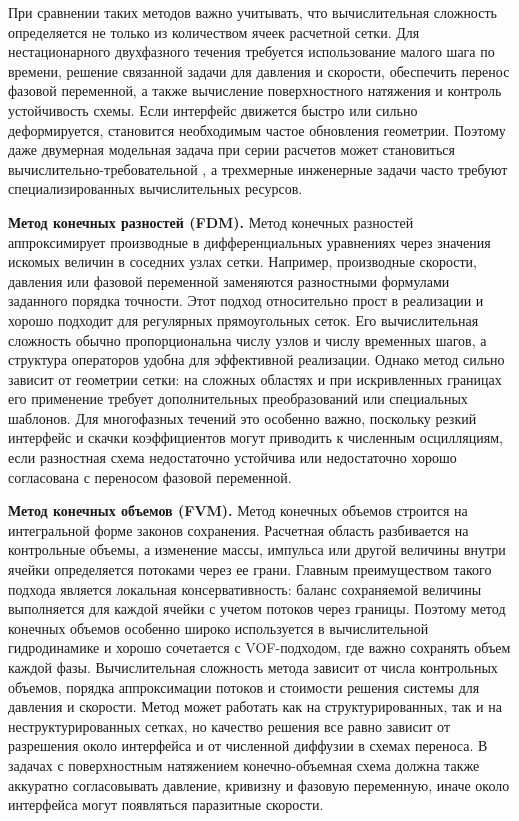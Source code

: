 \documentclass[12pt,a4paper]{article}
\begin{document}
При сравнении таких методов важно учитывать, что вычислительная сложность
определяется не только из количеством ячеек расчетной сетки. Для нестационарного двухфазного течения
требуется использование малого шага по времени, решение связанной задачи для давления и
скорости, обеспечить перенос фазовой переменной, а также вычисление поверхностного натяжения и
контроль устойчивость схемы. Если интерфейс движется быстро или сильно
деформируется, становится необходимым частое обновления геометрии. Поэтому даже
двумерная модельная задача при серии расчетов может становиться вычислительно-требовательной , а
трехмерные инженерные задачи часто требуют специализированных вычислительных
ресурсов.

\textbf{Метод конечных разностей (FDM).}
Метод конечных разностей аппроксимирует производные в дифференциальных
уравнениях через значения искомых величин в соседних узлах сетки. Например,
производные скорости, давления или фазовой переменной заменяются разностными
формулами заданного порядка точности. Этот подход относительно прост в
реализации и хорошо подходит для регулярных прямоугольных сеток. Его
вычислительная сложность обычно пропорциональна числу узлов и числу временных
шагов, а структура операторов удобна для эффективной реализации. Однако метод
сильно зависит от геометрии сетки: на сложных областях и при искривленных
границах его применение требует дополнительных преобразований или специальных
шаблонов. Для многофазных течений это особенно важно, поскольку резкий
интерфейс и скачки коэффициентов могут приводить к численным осцилляциям, если
разностная схема недостаточно устойчива или недостаточно хорошо согласована с
переносом фазовой переменной.

\textbf{Метод конечных объемов (FVM).}
Метод конечных объемов строится на интегральной форме законов сохранения.
Расчетная область разбивается на контрольные объемы, а изменение массы,
импульса или другой величины внутри ячейки определяется потоками через ее
грани. Главным преимуществом такого подхода является локальная
консервативность: баланс сохраняемой величины выполняется для каждой ячейки с
учетом потоков через границы. Поэтому метод конечных объемов особенно широко
используется в вычислительной гидродинамике и хорошо сочетается с VOF-подходом,
где важно сохранять объем каждой фазы. Вычислительная сложность метода зависит
от числа контрольных объемов, порядка аппроксимации потоков и стоимости решения
системы для давления и скорости. Метод может работать как на структурированных,
так и на неструктурированных сетках, но качество решения все равно зависит от
разрешения около интерфейса и от численной диффузии в схемах переноса. В
задачах с поверхностным натяжением конечно-объемная схема должна также
аккуратно согласовывать давление, кривизну и фазовую переменную, иначе около
интерфейса могут появляться паразитные скорости.
\end{document}
